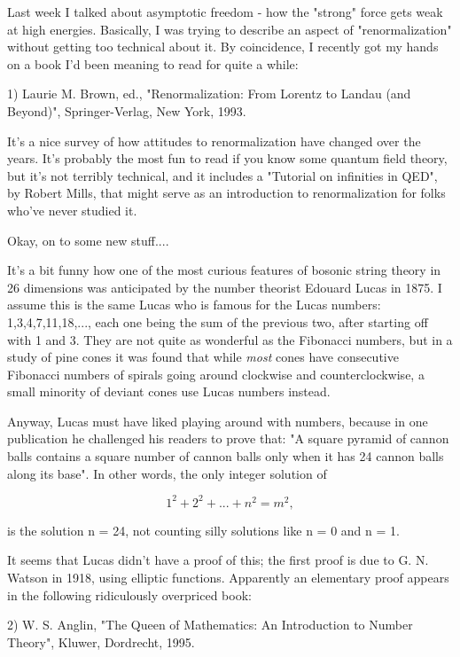 

Last week I talked about asymptotic freedom - how the "strong" force 
gets weak at high energies.   Basically, I was trying to describe an 
aspect of "renormalization" without getting too technical about it.  
By coincidence, I recently got my hands on a book I'd been meaning 
to read for quite a while:

1) Laurie M. Brown, ed., "Renormalization: From Lorentz
to Landau (and Beyond)", Springer-Verlag, New York, 1993.

It's a nice survey of how attitudes to renormalization have changed 
over the years.  It's probably the most fun to read if you know some 
quantum field theory, but it's not terribly technical, and it includes 
a "Tutorial on infinities in QED", by Robert Mills, that might serve 
as an introduction to renormalization for folks who've never studied 
it.

Okay, on to some new stuff....  

It's a bit funny how one of the most curious features of bosonic 
string theory in 26 dimensions was anticipated by the number theorist 
Edouard Lucas in 1875.  I assume this is the same Lucas who is famous 
for the Lucas numbers: 1,3,4,7,11,18,..., each one being the sum of 
the previous two, after starting off with 1 and 3.  They are not 
quite as wonderful as the Fibonacci numbers, but in a study of pine 
cones it was found that while \emph{most} cones have consecutive Fibonacci 
numbers of spirals going around clockwise and counterclockwise, a 
small minority of deviant cones use Lucas numbers instead.  

Anyway, Lucas must have liked playing around with numbers, because 
in one publication he challenged his readers to prove that: "A square 
pyramid of cannon balls contains a square number of cannon balls only
when it has 24 cannon balls along its base".  In other words, the 
only integer solution of

$$
           1^{2} + 2^{2} + ... + n^{2} = m^{2},
$$
    
is the solution n = 24, not counting silly solutions like n = 0 and
n = 1.

It seems that Lucas didn't have a proof of this; the first proof is
due to G. N. Watson in 1918, using elliptic functions.   Apparently 
an elementary proof appears in the following ridiculously overpriced book:

2) W. S. Anglin, "The Queen of Mathematics: An Introduction to
Number Theory", Kluwer, Dordrecht, 1995.

